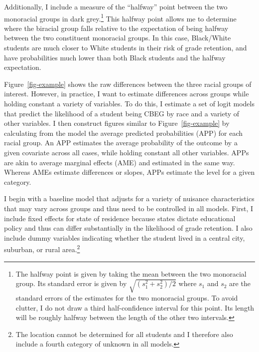 \documentclass[
  12pt,
  letterpaper,
]{article}
\begin{document}
Additionally, I include a measure of the ``halfway'' point between the
two monoracial groups in dark grey.\footnote{The halfway point is given
  by taking the mean between the two monoracial group. Its standard
  error is given by \(\sqrt{(s_1^2+s_2^2)/2}\) where \(s_1\) and \(s_2\)
  are the standard errors of the estimates for the two monoracial
  groups. To avoid clutter, I do not draw a third half-confidence
  interval for this point. Its length will be roughly halfway between
  the length of the other two intervals.} This halfway point allows me
to determine where the biracial group falls relative to the expectation
of being halfway between the two constituent monoracial groups. In this
case, Black/White students are much closer to White students in their
risk of grade retention, and have probabilities much lower than both
Black students and the halfway expectation.

Figure~\ref{fig-example} shows the raw differences between the three
racial groups of interest. However, in practice, I want to estimate
differences across groups while holding constant a variety of variables.
To do this, I estimate a set of logit models that predict the likelihood
of a student being CBEG by race and a variety of other variables. I then
construct figures similar to Figure~\ref{fig-example} by calculating
from the model the average predicted probabilities (APP) for each racial
group. An APP estimates the average probability of the outcome by a
given covariate across all cases, while holding constant all other
variables. APPs are akin to average marginal effects (AME) and estimated
in the same way. Whereas AMEs estimate differences or slopes, APPs
estimate the level for a given category.

I begin with a baseline model that adjusts for a variety of nuisance
characteristics that may vary across groups and thus need to be
controlled in all models. First, I include fixed effects for state of
residence because states dictate educational policy and thus can differ
substantially in the likelihood of grade retention. I also include dummy
variables indicating whether the student lived in a central city,
suburban, or rural area.\footnote{The location cannot be determined for
  all students and I therefore also include a fourth category of unknown
  in all models.}
\end{document}
